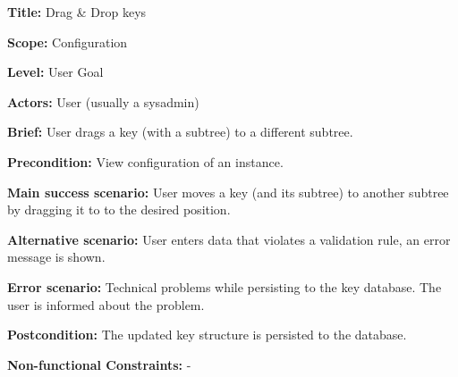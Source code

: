 
\begin{DoxyItemize}
\item {\bfseries{Title\+:}} Drag \& Drop keys
\item {\bfseries{Scope\+:}} Configuration
\item {\bfseries{Level\+:}} User Goal
\item {\bfseries{Actors\+:}} User (usually a sysadmin)
\item {\bfseries{Brief\+:}} User drags a key (with a subtree) to a different subtree.
\end{DoxyItemize}


\begin{DoxyItemize}
\item {\bfseries{Precondition\+:}} View configuration of an instance.
\item {\bfseries{Main success scenario\+:}} User moves a key (and its subtree) to another subtree by dragging it to to the desired position.
\item {\bfseries{Alternative scenario\+:}} User enters data that violates a validation rule, an error message is shown.
\item {\bfseries{Error scenario\+:}} Technical problems while persisting to the key database. The user is informed about the problem.
\item {\bfseries{Postcondition\+:}} The updated key structure is persisted to the database.
\item {\bfseries{Non-\/functional Constraints\+:}} -\/ 
\end{DoxyItemize}